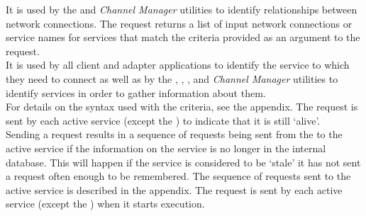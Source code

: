 It is used by the  and \emph{Channel Manager} utilities to
identify relationships between \yarp{} network connections.
The  request returns a list of
input \yarp{} network connections or service names for services that match the criteria
provided as an argument to the request.\\

It is used by all client and adapter applications to identify the service to which they
need to connect as well as by the ,
, ,
 and \emph{Channel Manager} utilities to identify services
in order to gather information about them.\\

For details on the syntax used with the criteria, see the 
 appendix.
The  request is sent by each
active service (except the ) to indicate
that it is still `alive'.\\

Sending a  request results in a
sequence of requests being sent from the 
to the active service if the information on the service is no longer in the internal
database.
This will happen if the service is considered to be `stale' \longDash{} it has not sent a
 request often enough to be
remembered.
The sequence of requests sent to the active service is described in the 
 appendix.
The  request is sent by each
active service (except the ) when it
starts execution.\\


